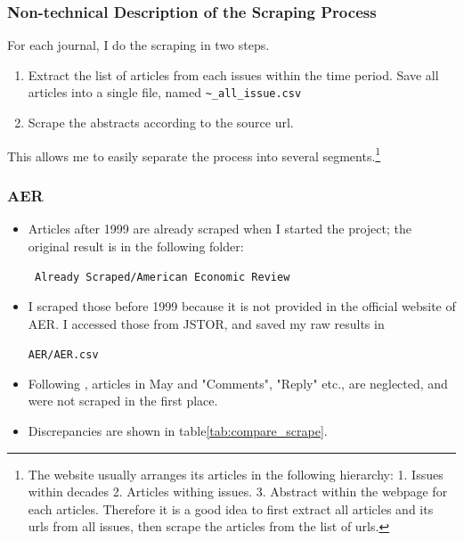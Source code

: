 \subsubsection*{Non-technical Description of the Scraping Process}

For each journal, I do the scraping in two steps. 

\begin{enumerate}
    \item Extract the list of articles from each issues within the time period. Save all articles into a single file, named \verb|~_all_issue.csv|
    \item Scrape the abstracts according to the source url.
\end{enumerate}

This allows me to easily separate the process into several segments.\footnote{The website usually arranges its articles in the following hierarchy: 1. Issues within decades 2. Articles withing issues. 3. Abstract within the webpage for each articles. Therefore it is a good idea to first extract all articles and its urls from all issues, then scrape the articles from the list of urls.}

\subsubsection*{AER}

\begin{itemize}
    \item Articles after 1999 are already scraped when I started the project; the original result is in the following folder: \\

    \begin{center}
        \verb| Already Scraped/American Economic Review|
    \end{center}

    \item I scraped those before 1999 because it is not provided in the official website of AER. I accessed those from JSTOR, and saved my raw results in 

    \begin{center}
        \verb|AER/AER.csv|
    \end{center} 

    \item Following \cite{Hengel17}, articles in May and "Comments", "Reply" etc., are neglected, and were not scraped in the first place.
    
    \item Discrepancies are shown in table\ref{tab:compare_scrape}.
\end{itemize}

